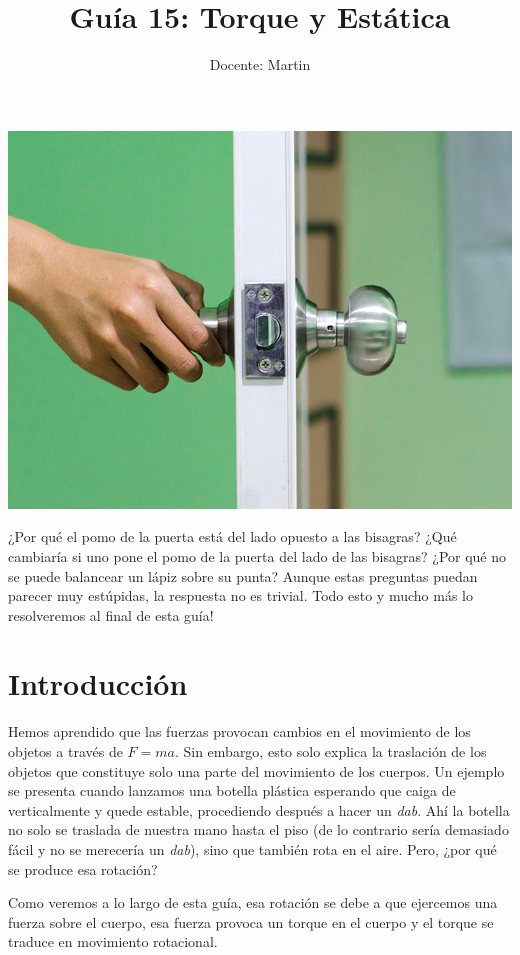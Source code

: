 \documentclass[letterpaper]{article}
\author{Docente: Martin}
\date{}
\title{\bf Guía 15: Torque y Estática}
\begin{document}
\maketitle
\thispagestyle{fancy}
\begin{center}
\includegraphics[scale=1.2]{portada.jpg}
\end{center}
\pagebreak

¿Por qué el pomo de la puerta está del lado opuesto a las bisagras? ¿Qué cambiaría si uno pone el pomo de la puerta del lado de las bisagras? ¿Por qué no se puede balancear un lápiz sobre su punta? Aunque estas preguntas puedan parecer muy estúpidas, la respuesta no es trivial. Todo esto y mucho más lo resolveremos al final de esta guía!

\section*{Introducción}

Hemos aprendido que las fuerzas provocan cambios en el movimiento de los objetos a través de $F = ma$. Sin embargo, esto solo explica la traslación de los objetos que constituye solo una parte del movimiento de los cuerpos. Un ejemplo se presenta cuando lanzamos una botella plástica esperando que caiga de verticalmente y quede estable, procediendo después a hacer un \emph{dab}. Ahí la botella no solo se traslada de nuestra mano hasta el piso (de lo contrario sería demasiado fácil y no se merecería un \emph{dab}), sino que también rota en el aire. Pero, ¿por qué se produce esa rotación?

Como veremos a lo largo de esta guía, esa rotación se debe a que ejercemos una fuerza sobre el cuerpo, esa fuerza provoca un torque en el cuerpo y el torque se traduce en movimiento rotacional.
\end{document}
